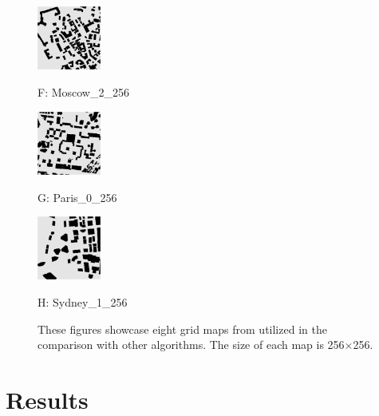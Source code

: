 \documentclass[lettersize,journal]{IEEEtran}
\begin{document}
\begin{figure}[t]
\hfill
\begin{minipage}{.24\linewidth}
  \centerline{\includegraphics[width=2.1cm]{Moscow_2_256.png}}
  \centerline{F: Moscow\_2\_256}
\end{minipage}
\hfill
\begin{minipage}{.24\linewidth}
  \centerline{\includegraphics[width=2.1cm]{Paris_0_256.png}}
  \centerline{G: Paris\_0\_256}
\end{minipage}
\hfill
\begin{minipage}{.24\linewidth}
  \centerline{\includegraphics[width=2.1cm]{Sydney_1_256.png}}
  \centerline{H: Sydney\_1\_256}
\end{minipage}
\vfill

\caption{These figures showcase eight grid maps from \cite{sturtevant2012benchmarks} utilized in the comparison with other algorithms. The size of each map is 256$\times$256.}
\label{city_maps}
\end{figure}

\section{Results}
\label{Results}
\end{document}
